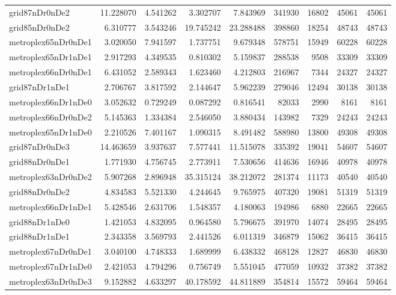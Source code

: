 \begin{longtable}{|l|r|r|r|r|r|r|r|r|}
grid87nDr0nDe2 & 11.228070 & 4.541262 & 3.302707 & 7.843969 & 341930 & 16802 & 45061 & 45061 \\
grid85nDr0nDe2 & 6.310777 & 3.543246 & 19.745242 & 23.288488 & 398860 & 18254 & 48743 & 48743 \\
metroplex65nDr0nDe1 & 3.020050 & 7.941597 & 1.737751 & 9.679348 & 578751 & 15949 & 60228 & 60228 \\
metroplex65nDr1nDe1 & 2.917293 & 4.349535 & 0.810302 & 5.159837 & 288538 & 9508 & 33309 & 33309 \\
metroplex66nDr0nDe1 & 6.431052 & 2.589343 & 1.623460 & 4.212803 & 216967 & 7344 & 24327 & 24327 \\
grid87nDr1nDe1 & 2.706767 & 3.817592 & 2.144647 & 5.962239 & 279046 & 12494 & 30138 & 30138 \\
metroplex66nDr1nDe0 & 3.052632 & 0.729249 & 0.087292 & 0.816541 & 82033 & 2990 & 8161 & 8161 \\
metroplex66nDr0nDe2 & 5.145363 & 1.334384 & 2.546050 & 3.880434 & 143982 & 7329 & 24243 & 24243 \\
metroplex65nDr1nDe0 & 2.210526 & 7.401167 & 1.090315 & 8.491482 & 588980 & 13800 & 49308 & 49308 \\
grid87nDr0nDe3 & 14.463659 & 3.937637 & 7.577441 & 11.515078 & 335392 & 19041 & 54607 & 54607 \\
grid88nDr0nDe1 & 1.771930 & 4.756745 & 2.773911 & 7.530656 & 414636 & 16946 & 40978 & 40978 \\
metroplex63nDr0nDe2 & 5.907268 & 2.896948 & 35.315124 & 38.212072 & 281374 & 11173 & 40540 & 40540 \\
grid88nDr0nDe2 & 4.834583 & 5.521330 & 4.244645 & 9.765975 & 407320 & 19081 & 51319 & 51319 \\
metroplex66nDr1nDe1 & 5.428546 & 2.631706 & 1.548357 & 4.180063 & 194986 & 6880 & 22665 & 22665 \\
grid88nDr1nDe0 & 1.421053 & 4.832095 & 0.964580 & 5.796675 & 391970 & 14074 & 28495 & 28495 \\
grid88nDr1nDe1 & 2.343358 & 3.569793 & 2.441526 & 6.011319 & 346879 & 15062 & 36415 & 36415 \\
metroplex67nDr0nDe1 & 3.040100 & 4.748333 & 1.689999 & 6.438332 & 468128 & 12827 & 46830 & 46830 \\
metroplex67nDr1nDe0 & 2.421053 & 4.794296 & 0.756749 & 5.551045 & 477059 & 10932 & 37382 & 37382 \\
metroplex63nDr0nDe3 & 9.152882 & 4.633297 & 40.178592 & 44.811889 & 354814 & 15572 & 59464 & 59464 \\

\end{longtable}
